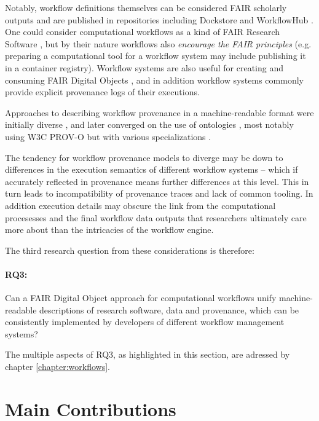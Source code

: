 Notably, workflow definitions themselves can be considered FAIR scholarly outputs \cite{Goble 2020} and are published in repositories including Dockstore \cite{Yuen 2021} and WorkflowHub \cite{Goble 2021}.
One could consider computational workflows as a kind of FAIR Research Software \cite{de Visser 2023}, but by their nature workflows also \emph{encourage the FAIR principles} (e.g. preparing a computational tool for a workflow system \cite{Brack 2022a} may include publishing it in a container registry). Workflow systems are also useful for creating and consuming FAIR Digital Objects \cite{Wittenburg 2021}, and in addition workflow systems commonly provide explicit provenance logs of their executions.

Approaches to describing workflow provenance in a machine-readable format were initially diverse \cite{Cruz 2009}, and later converged on the use of ontologies \cite{Missier 2010}, most notably using W3C PROV-O \cite{Lebo 2013a} but with various specializations \cite{Garijo 2011,Garijo 2012,Missier 2013,Belhajjame 2015,Cuevas-Vicenttín 2016}. 

The tendency for workflow provenance models to diverge may be down to differences in the execution semantics of different workflow systems -- which if accurately reflected in provenance means further differences at this level. This in turn leads to incompatibility of provenance traces and lack of common tooling. In addition execution details may obscure the link from the computational procesesses and the final workflow data outputs that researchers ultimately care more about than the intricacies of the workflow engine.

The third research question from these considerations is therefore: 

\paragraph{RQ3:} \label{rq3} Can a FAIR Digital Object approach for computational workflows unify machine-readable descriptions of research software, data and provenance, which can be consistently implemented by developers of different workflow management systems?

The multiple aspects of RQ3, as highlighted in this section, are adressed by chapter \ref{chapter:workflows}.


\section{Main Contributions}
\label{intro:contributions}

